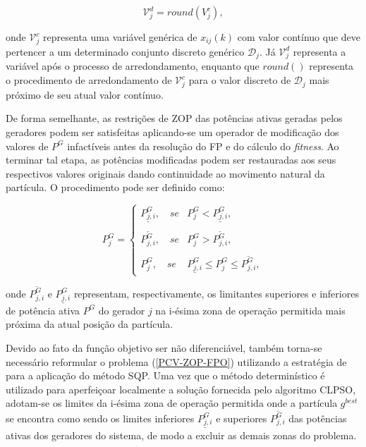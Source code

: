 \documentclass[
	12pt,				%
	openany,			%
	twoside,			%
	a4paper,			%
	chapter=TITLE,		%
	section=Title,		%
	subsection=Title,	%
	subsubsection=Title,%
	english,			%
	french,				%
	spanish,			%
	brazil			%
	]{abntex2}
\begin{document}
\begin{ERRATA}
\begin{equation}\label{round}
    \mathcal{V}^d_j = round({V}^c_j),
\end{equation}

\pagebreak
\noindent onde $\mathcal{V}^c_j$ representa uma variável genérica de $x_{ij}(k)$ com valor contínuo que deve pertencer a um determinado conjunto discreto genérico $\mathcal{D}_j$. Já $\mathcal{V}^d_j$ representa a variável após o processo de arredondamento, enquanto que $round()$ representa o procedimento de arredondamento de $\mathcal{V}^c_j$ para o valor discreto de $\mathcal{D}_j$ mais próximo de seu atual valor contínuo.

De forma semelhante, as restrições de ZOP das potências ativas geradas pelos geradores podem ser satisfeitas aplicando-se um operador de modificação dos valores de $P^G$ infactíveis antes da resolução do FP e do cálculo do \emph{fitness}. Ao terminar tal etapa, as potências modificadas podem ser restauradas aos seus respectivos valores originais dando continuidade ao movimento natural da partícula. O procedimento pode ser definido como:


\begin{equation}\label{proc100}
P^G_j = \begin{cases}
\underline{P^G_{j,i}}, \quad se & P^G_j < \underline{P^G_{j,i}},\\\\
\overline{P^G_{j,i}}, \quad se & P^G_j > \overline{P^G_{j,i}},\\\\
P^G_{j}, \quad se & \underline{P^G_{j,i}} \leq P^G_j \leq \overline{P^G_{j,i}},
\end{cases}
\end{equation}

\noindent onde $\overline{P^G_{j,i}}$ e $\underline{P^G_{j,i}}$ representam, respectivamente, os limitantes superiores e inferiores de potência ativa $P^G$ do gerador $j$ na i-ésima zona de operação permitida mais próxima da atual posição da partícula.

Devido ao fato da função objetivo ser não diferenciável, também torna-se necessário reformular o problema (\ref{PCV-ZOP-FPO}) utilizando a estratégia de  para a aplicação do método SQP. Uma vez que o método determinístico é utilizado para aperfeiçoar localmente a solução fornecida pelo algoritmo CLPSO, adotam-se os limites da i-ésima zona de operação permitida onde a partícula $g^{best}$ se encontra como sendo os limites inferiores $\underline{P^{G}_{j,i}}$ e superiores $\overline{P^{G}_{j,i}}$ das potências ativas dos geradores do sistema, de modo a excluir as demais zonas do problema. 


\end{ERRATA}
\end{document}
